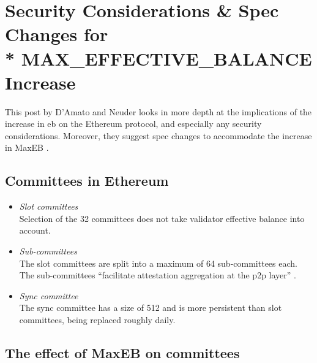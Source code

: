 \documentclass[UTF8]{article}
\begin{document}

\section{Security Considerations \& Spec Changes for \\* MAX\_EFFECTIVE\_BALANCE Increase}
\label{sec:security}
This post by D'Amato and Neuder looks in more depth at the implications of the increase in \gls{eb} on the Ethereum protocol, and especially any security considerations. Moreover, they suggest spec changes to accommodate the increase in MaxEB \cite{damato2023}. 

\subsection{Committees in Ethereum}
\begin{itemize}
\item \textit{Slot committees}\\
Selection of the 32 committees does not take validator effective balance into account. 
\item \textit{Sub-committees} \\
The slot committees are split into a maximum of 64 sub-committees each. The sub-committees ``facilitate attestation aggregation at the p2p layer'' \cite{damato2023}. 
\item \textit{Sync committee} \\
The sync committee has a size of 512 and is more persistent than slot committees, being replaced roughly daily. 
\end{itemize}

\subsection{The effect of MaxEB on committees}
\end{document}
